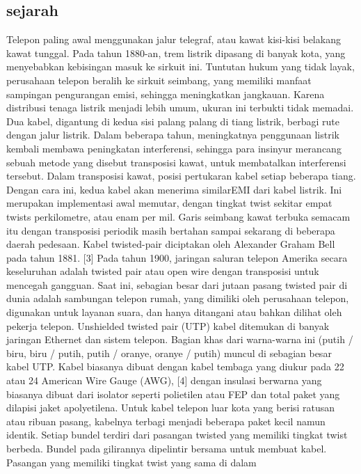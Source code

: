 \subsection{sejarah}
Telepon paling awal menggunakan jalur telegraf, atau kawat kisi-kisi belakang kawat tunggal. Pada tahun 1880-an, trem listrik dipasang di banyak kota, 
yang menyebabkan kebisingan masuk ke sirkuit ini. Tuntutan hukum yang tidak layak, perusahaan telepon beralih ke sirkuit seimbang, yang memiliki manfaat 
sampingan pengurangan emisi, sehingga meningkatkan jangkauan. Karena distribusi tenaga listrik menjadi lebih umum, ukuran ini terbukti tidak memadai. 
Dua kabel, digantung di kedua sisi palang palang di tiang listrik, berbagi rute dengan jalur listrik. Dalam beberapa tahun, meningkatnya penggunaan 
listrik kembali membawa peningkatan interferensi, sehingga para insinyur merancang sebuah metode yang disebut transposisi kawat, untuk membatalkan 
interferensi tersebut. Dalam transposisi kawat, posisi pertukaran kabel setiap beberapa tiang. Dengan cara ini, kedua kabel akan menerima similarEMI 
dari kabel listrik. Ini merupakan implementasi awal memutar, dengan tingkat twist sekitar empat twists perkilometre, atau enam per mil. Garis seimbang 
kawat terbuka semacam itu dengan transposisi periodik masih bertahan sampai sekarang di beberapa daerah pedesaan. Kabel twisted-pair diciptakan oleh 
Alexander Graham Bell pada tahun 1881. [3] Pada tahun 1900, jaringan saluran telepon Amerika secara keseluruhan adalah twisted pair atau open wire dengan 
transposisi untuk mencegah gangguan. Saat ini, sebagian besar dari jutaan pasang twisted pair di dunia adalah sambungan telepon rumah, yang dimiliki oleh 
perusahaan telepon, digunakan untuk layanan suara, dan hanya ditangani atau bahkan dilihat oleh pekerja telepon. Unshielded twisted pair (UTP) kabel 
ditemukan di banyak jaringan Ethernet dan sistem telepon. Bagian khas dari warna-warna ini (putih / biru, biru / putih, putih / oranye, oranye / putih) 
muncul di sebagian besar kabel UTP. Kabel biasanya dibuat dengan kabel tembaga yang diukur pada 22 atau 24 American Wire Gauge (AWG), [4] dengan insulasi 
berwarna yang biasanya dibuat dari isolator seperti polietilen atau FEP dan total paket yang dilapisi jaket apolyetilena. Untuk kabel telepon luar kota 
yang berisi ratusan atau ribuan pasang, kabelnya terbagi menjadi beberapa paket kecil namun identik. Setiap bundel terdiri dari pasangan twisted yang 
memiliki tingkat twist berbeda. Bundel pada gilirannya dipelintir bersama untuk membuat kabel. Pasangan yang memiliki tingkat twist yang sama di dalam 
